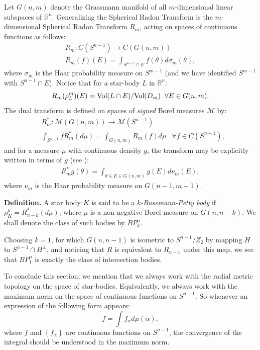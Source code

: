 \documentclass[12pt,oneside]{amsart}
\theoremstyle{definition}
\theoremstyle{remark}
\theoremstyle{proof}
\numberwithin{equation}{section}
\newcommand{\set}[1]{\left\{#1\right\}}
\newcommand{\Real}{\mathbb{R}}
\newcommand{\To}{\longrightarrow}
\newcommand{\BP}{BP}
\newcommand{\M}{\mathcal{M}}
\newcommand{\Vol}[1]{\textnormal{Vol} (#1)}
\newcommand{\definition}[1]{\medskip\noindent\textbf{Definition.}#1\medskip}
\begin{document}
Let $G(n,m)$ denote the Grassmann manifold of all $m$-dimensional
linear subspaces of $\Real^n$. Generalizing the Spherical Radon
Transform is the $m$-dimensional Spherical Radon Transform $R_m$,
acting on spaces of continuous functions as follows:
\begin{eqnarray}
\nonumber R_m: C(S^{n-1}) \To C(G(n,m)) \\
\nonumber R_m(f) (E) = \int_{S^{n-1}\cap E} f(\theta)
d\sigma_m(\theta) ,
\end{eqnarray}
where $\sigma_m$ is the Haar probability measure on $S^{m-1}$ (and
we have identified $S^{m-1}$ with $S^{n-1} \cap E$). Notice that
for a star-body $L$ in $\Real^n$:
\[
R_m(\rho^m_L)(E) =  \Vol{L \cap E} / \Vol{D_m} \;\; \forall E \in
G(n,m).
\]
The dual transform is defined on spaces of \emph{signed} Borel
measures $\M$ by:
\begin{eqnarray}
\label{eq:duality111} & R_m^*: \M(G(n,m)) \To \M(S^{n-1}) & \\
\nonumber & \int_{S^{n-1}} f R_m^*(d\mu) = \int_{G(n,m)} R_m(f)
d\mu & \forall f \in C(S^{n-1}),
\end{eqnarray}
and for a measure $\mu$ with continuous density $g$, the
transform may be explicitly written in terms of $g$ (see
\cite{Zhang-Gen-BP}):
\begin{eqnarray}
\nonumber R_m^* g (\theta) = \int_{\theta \in E \in G(n,m)} g(E)
d\nu_{m}(E) ,
\end{eqnarray}
where $\nu_{m}$ is the Haar probability measure on $G(n-1,m-1)$.

\definition{
A star body $K$ is said to be a \emph{$k$-Busemann-Petty body} if
$\rho_K^k = R_{n-k}^*(d\mu)$, where $\mu$ is a non-negative Borel
measure on $G(n,n-k)$. We shall denote the class of such bodies
by $\BP_k^n$. }

Choosing $k=1$, for which $G(n,n-1)$ is isometric to $S^{n-1} /
Z_2$ by mapping $H$ to $S^{n-1}\cap H^\perp$, and noticing that
$R$ is equivalent to $R_{n-1}$ under this map, we see that
$\BP_1^n$ is exactly the class of intersection bodies.

\medskip

To conclude this section, we mention that we always work with the
radial metric topology on the space of star-bodies. Equivalently,
we always work with the maximum norm on the space of continuous
functions on $S^{n-1}$. So whenever an expression of the
following form appears:
\[
f = \int f_\alpha d\mu(\alpha),
\]
where $f$ and $\set{f_\alpha}$ are continuous functions on
$S^{n-1}$, the convergence of the integral should be understood in
the maximum norm.
\end{document}
